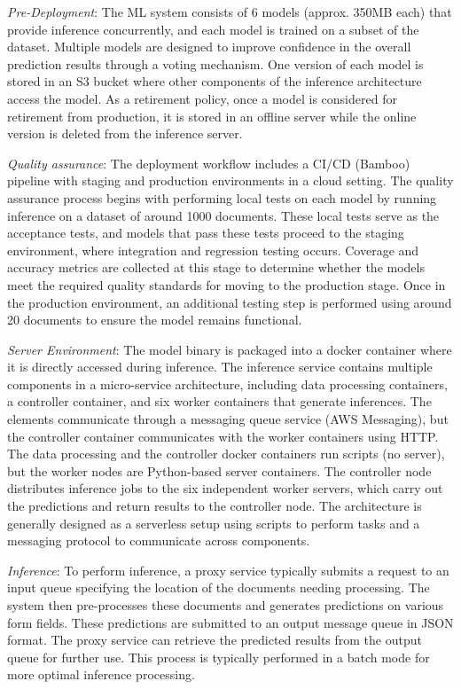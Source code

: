 \textit{Pre-Deployment}: The ML system consists of 6 models (approx. 350MB each) that provide inference concurrently, and each model is trained on a subset of the dataset. Multiple models are designed to improve confidence in the overall prediction results through a voting mechanism. One version of each model is stored in an S3 bucket where other components of the inference architecture access the model. As a retirement policy, once a model is considered for retirement from production, it is stored in an offline server while the online version is deleted from the inference server.

\textit{Quality assurance}: The deployment workflow includes a CI/CD (Bamboo) pipeline with staging and production environments in a cloud setting. The quality assurance process begins with performing local tests on each model by running inference on a dataset of around 1000 documents. These local tests serve as the acceptance tests, and models that pass these tests proceed to the staging environment, where integration and regression testing occurs. Coverage and accuracy metrics are collected at this stage to determine whether the models meet the required quality standards for moving to the production stage. Once in the production environment, an additional testing step is performed using around 20 documents to ensure the model remains functional.

\textit{Server Environment}: The model binary is packaged into a docker container where it is directly accessed during inference. The inference service contains multiple components in a micro-service architecture, including data processing containers, a controller container, and six worker containers that generate inferences. The elements communicate through a messaging queue service (AWS Messaging), but the controller container communicates with the worker containers using HTTP. The data processing and the controller docker containers run scripts (no server), but the worker nodes are Python-based server containers. The controller node distributes inference jobs to the six independent worker servers, which carry out the predictions and return results to the controller node. The architecture is generally designed as a serverless setup using scripts to perform tasks and a messaging protocol to communicate across components.

\textit{Inference}: To perform inference, a proxy service typically submits a request to an input queue specifying the location of the documents needing processing. The system then pre-processes these documents and generates predictions on various form fields. These predictions are submitted to an output message queue in JSON format. The proxy service can retrieve the predicted results from the output queue for further use. This process is typically performed in a batch mode for more optimal inference processing.

